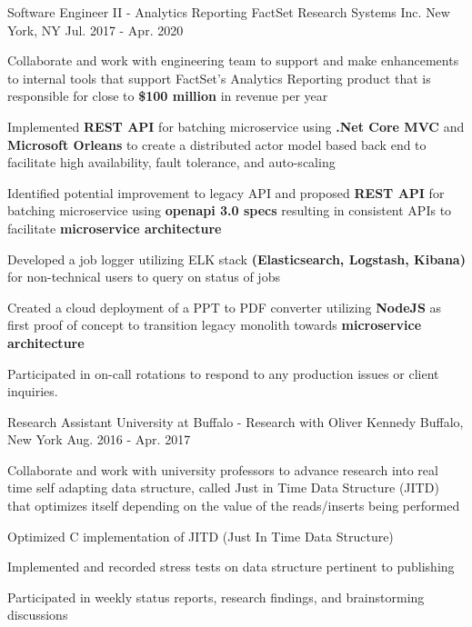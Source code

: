 \begin{cventries}
  \cventry
    {Software Engineer II - Analytics Reporting} %
    {FactSet Research Systems Inc.} %
    {New York, NY} %
    {Jul. 2017 - Apr. 2020} %
    {
      \begin{cvitems} %
        \item  Collaborate and work with engineering team to support and make enhancements to internal tools that support FactSet's Analytics Reporting product that is responsible for close to \textbf{\$100 million} in revenue per year
        \item {Implemented \textbf{REST API} for batching microservice using \textbf{.Net Core MVC} and \textbf{Microsoft Orleans} to create a distributed actor model based back end to facilitate high availability, fault tolerance, and auto-scaling }
        \item {Identified potential improvement to legacy API and proposed \textbf{REST API} for batching microservice using \textbf{openapi 3.0 specs} resulting in consistent APIs to facilitate \textbf{microservice architecture}}
        \item {Developed a job logger utilizing ELK stack \textbf{(Elasticsearch, Logstash, Kibana)} for non-technical users to query on status of jobs}
        \item {Created a cloud deployment of a PPT to PDF converter utilizing \textbf{NodeJS} as first proof of concept to transition legacy monolith towards \textbf{microservice architecture}}
        \item Participated in on-call rotations to respond to any production issues or client inquiries. 
      \end{cvitems}
    }

  \cventry
    {Research Assistant} %
    {University at Buffalo - Research with Oliver Kennedy} %
    {Buffalo, New York} %
    {Aug. 2016 - Apr. 2017} %
    {
      \begin{cvitems} %
        \item Collaborate and work with university professors to advance research into real time self adapting data structure, called Just in Time Data Structure (JITD) that optimizes itself depending on the value of the reads/inserts being performed
        \item {Optimized C implementation of JITD (Just In Time Data Structure)}
        \item {Implemented and recorded stress tests on data structure pertinent to publishing}
        \item Participated in weekly status reports, research findings, and brainstorming discussions
      \end{cvitems}
    }
\end{cventries}
